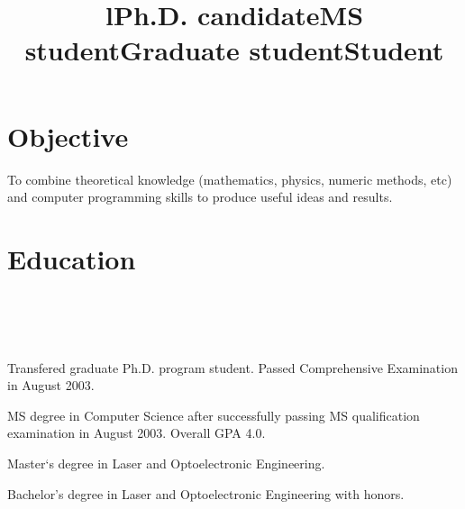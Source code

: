 \documentclass[10pt,overlapped,line]{res}
\begin{document}
\begin{resume}

\section{Objective}
To combine theoretical knowledge (mathematics, physics, numeric
methods, etc) and computer programming skills to produce useful ideas
and results.

\section{Education}
\begin{format}
  \title{l}\\
  \\
  \body\\
\end{format}

\title{Ph.D. candidate}
\begin{position}
  Transfered graduate Ph.D. program student. Passed Comprehensive Examination in August 2003.
\end{position}

 \title{MS student}
 \begin{position}
  MS degree in Computer Science after successfully passing MS
 qualification examination in August 2003.  Overall GPA 4.0.
 \end{position}

 \title{Graduate student}
 \begin{position}
  Master`s degree in Laser and Optoelectronic Engineering.
 \end{position}

 \title{Student}
 \begin{position}
  Bachelor's degree in Laser and Optoelectronic Engineering with
  honors.
 \end{position}


\end{resume}
\end{document}
